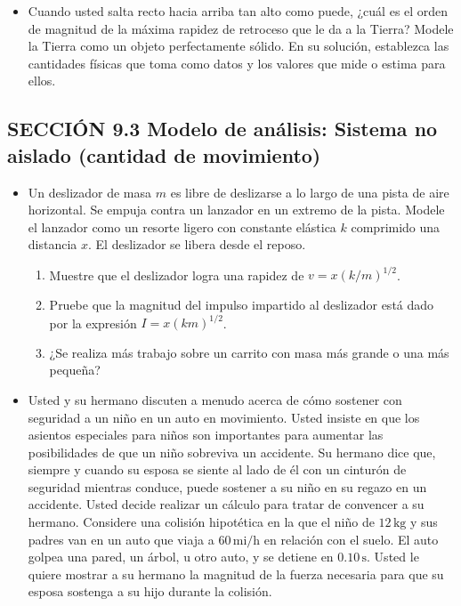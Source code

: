 \documentclass[11pt,a4paper]{article}
\begin{document}
\newpage

\begin{itemize}
    \item[\textbf{6.}] Cuando usted salta recto hacia arriba tan alto como puede, ¿cuál es el orden de magnitud de la máxima rapidez de retroceso que le da a la Tierra? Modele la Tierra como un objeto perfectamente sólido. En su solución, establezca las cantidades físicas que toma como datos y los valores que mide o estima para ellos.
    \vspace*{6cm}
\end{itemize}

\subsection*{SECCIÓN 9.3 Modelo de análisis: Sistema no aislado (cantidad de movimiento)}

\begin{itemize}
    \item[\textbf{7.}] Un deslizador de masa \(m\) es libre de deslizarse a lo largo de una pista de aire horizontal. Se empuja contra un lanzador en un extremo de la pista. Modele el lanzador como un resorte ligero con constante elástica \(k\) comprimido una distancia \(x\). El deslizador se libera desde el reposo.
    \begin{enumerate}
        \item Muestre que el deslizador logra una rapidez de \(v = x(k/m)^{1/2}\).
        \item Pruebe que la magnitud del impulso impartido al deslizador está dado por la expresión \(I = x(km)^{1/2}\).
        \item ¿Se realiza más trabajo sobre un carrito con masa más grande o una más pequeña?
    \end{enumerate}
    \vspace*{6cm}

    \item[\textbf{8.}] Usted y su hermano discuten a menudo acerca de cómo sostener con seguridad a un niño en un auto en movimiento. Usted insiste en que los asientos especiales para niños son importantes para aumentar las posibilidades de que un niño sobreviva un accidente. Su hermano dice que, siempre y cuando su esposa se siente al lado de él con un cinturón de seguridad mientras conduce, puede sostener a su niño en su regazo en un accidente. Usted decide realizar un cálculo para tratar de convencer a su hermano. Considere una colisión hipotética en la que el niño de \(12\,\text{kg}\) y sus padres van en un auto que viaja a \(60\,\text{mi/h}\) en relación con el suelo. El auto golpea una pared, un árbol, u otro auto, y se detiene en \(0.10\,\text{s}\). Usted le quiere mostrar a su hermano la magnitud de la fuerza necesaria para que su esposa sostenga a su hijo durante la colisión.
    \vspace*{6cm}
\end{itemize}
\end{document}
